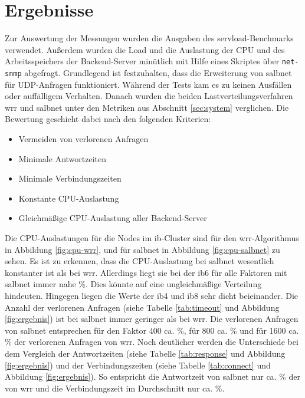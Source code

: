 \documentclass[a4paper, 12pt, BCOR10mm, DIV12, toc=bibliography, toc=listof, german]{scrbook}
\begin{document}

		\section{Ergebnisse} %
		\label{sec:Ergebnisse}


			Zur Auswertung der Messungen wurden die Ausgaben des servload-Benchmarks verwendet. Außerdem
			wurden die Load und die Auslastung der CPU und des Arbeitsspeichers der Backend-Server
			minütlich mit Hilfe eines Skriptes über \texttt{net-snmp} abgefragt. Grundlegend ist
			festzuhalten, dass die Erweiterung von salbnet für UDP-Anfragen funktioniert. Während der
			Tests kam es zu keinen Ausfällen oder auffälligem Verhalten. Danach wurden die beiden
			Lastverteilungsverfahren wrr und salbnet unter den Metriken aus Abschnitt \ref{sec:system}
			verglichen. Die Bewertung geschieht dabei nach den folgenden Kriterien:

			\begin{itemize}
				\item Vermeiden von verlorenen Anfragen
				\item Minimale Antwortzeiten
				\item Minimale Verbindungszeiten
				\item Konstante CPU-Auslastung
				\item Gleichmäßige CPU-Auslastung aller Backend-Server
			\end{itemize}

			Die CPU-Auslastungen für die Nodes im ib-Cluster sind für den wrr-Algorithmus in Abbildung
			\ref{fig:cpu-wrr}, und für salbnet in Abbildung \ref{fig:cpu-salbnet} zu sehen. Es ist zu
			erkennen, dass die CPU-Auslastung bei salbnet wesentlich konstanter ist als bei wrr.
			Allerdings liegt sie bei der ib6 für alle Faktoren mit salbnet immer nahe \unit[100]{\%}. Dies könnte
			auf eine ungleichmäßige Verteilung hindeuten. Hingegen liegen die Werte der ib4 und ib8 sehr
			dicht beieinander. Die Anzahl der verlorenen Anfragen (siehe Tabelle \ref{tab:timeout} und
			Abbildung \ref{fig:ergebnis}) ist bei salbnet immer geringer als bei wrr.  Die verlorenen
			Anfragen von salbnet entsprechen für den Faktor 400 ca. \unit[25]{\%}, für 800 ca. \unit[33]{\%} und für 1600
			ca. \unit[50]{\%} der verlorenen Anfragen von wrr. Noch deutlicher werden die Unterschiede bei dem
			Vergleich der
			Antwortzeiten (siehe Tabelle \ref{tab:response} und Abbildung \ref{fig:ergebnis}) und der
			Verbindungszeiten  (siehe Tabelle \ref{tab:connect} und Abbildung \ref{fig:ergebnis}).
			So entspricht die Antwortzeit von salbnet nur ca. \unit[15]{\%} der von wrr und die Verbindungszeit im
			Durchschnitt nur ca. \unit[30]{\%}.
\end{document}

